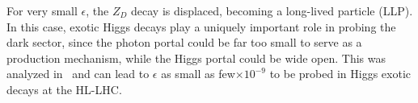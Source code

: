 
For very small $\epsilon$, the $Z_D$ decay is displaced, becoming a long-lived particle (LLP). In this case, exotic Higgs decays play a uniquely important role in probing the dark sector, since the photon portal could be far too small to serve as a production mechanism, while the Higgs portal could be wide open. 
%
This was analyzed in~\cite{Curtin:2014cca,Curtin:2018mvb} and can lead to $\epsilon$ as small as few$\times 10^{-9}$ to be probed in Higgs exotic decays at the HL-LHC. 



 
 

























%
%



%




